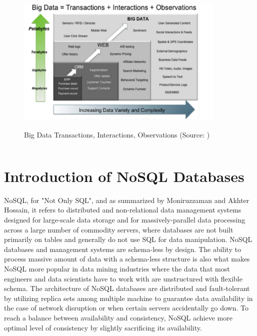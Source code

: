 \begin{figure}[H]
	\includegraphics[height=7cm, width=10cm]{../../../images/bigdata.png}
	\caption{Big Data Transactions, Interactions, Observations (Source: \cite{DBLP:journals/corr/MoniruzzamanH13})}
\end{figure}


\[\]


\section{Introduction of NoSQL Databases}

NoSQL, for "Not Only SQL", and as summarized by Moniruzzaman and Akhter Hossain\cite{DBLP:journals/corr/MoniruzzamanH13}, it refers to distributed and non-relational data management systems designed for large-scale data
storage and for massively-parallel data processing across a large number of commodity
servers, where databases are not built primarily on tables and generally do not use SQL for data manipulation. 
NoSQL databases and management systems are schema-less by design. The ability to process massive amount of data with a schema-less structure is also what makes NoSQL more popular in data mining industries where the data that most engineers and data scientists have to work with are  unstructured with flexible schema.
The architecture of NoSQL databases are distributed and fault-tolerant by utilizing replica sets among multiple machine to 
guarantee data availability in the case of network disruption or when certain servers accidentally go down.
To reach a
balance between availability and consistency, NoSQL achieve more optimal
level of consistency by slightly sacrificing its availability.  \\


